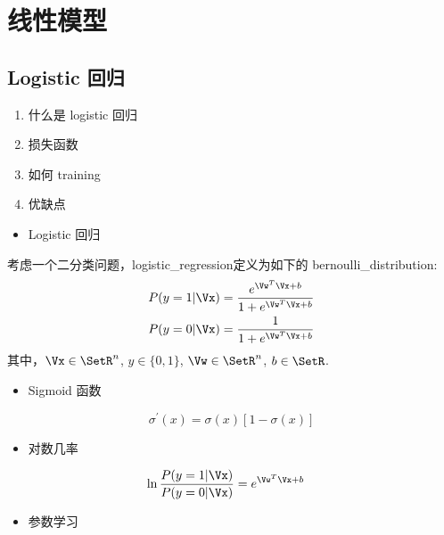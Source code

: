 \chapter{线性模型}
\label{chap:linear_model}

\section{Logistic 回归}

\begin{enumerate}
	\item 什么是 logistic 回归
	\item 损失函数
	\item 如何 training
	\item 优缺点
\end{enumerate}

\begin{itemize}
	\item Logistic 回归
\end{itemize}

考虑一个二分类问题，\gls{logistic_regression}定义为如下的 
\gls{bernoulli_distribution}:
\begin{align}
	P(y=1|\Vx) &= \frac{e^{\Vw^T\Vx+b}}{1 + e^{\Vw^T\Vx+b}} \label{logistic_pos} \\ 
	P(y=0|\Vx) &= \frac{1}{1 + e^{\Vw^T\Vx+b}} \label{logistic_neg}
\end{align}
其中，$\Vx \in \SetR^n$, $y \in \{0, 1\}$, $\Vw \in \SetR^n$, 
$b \in \SetR$.

\begin{itemize}
  \item Sigmoid 函数
\end{itemize}

\begin{equation}
	\sigma^{'}(x) = \sigma(x)[1-\sigma(x)]
\end{equation}


\begin{itemize}
  \item 对数几率
\end{itemize}

\begin{align}
	\ln \frac{P(y=1|\Vx)}{P(y=0|\Vx)} &= e^{\Vw^T\Vx+b} \label{logistic_prob}
\end{align}


\begin{itemize}
  \item 参数学习
\end{itemize}


